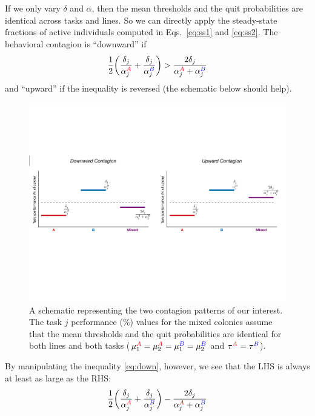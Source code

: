 \documentclass[11pt]{article}
\newcommand{\A}{{\color{red}A}}
\newcommand{\B}{{\color{blue}B}}
\begin{document}
\begin{appendices}
If we only vary $\delta$ and $\alpha$, then the mean thresholds and the quit probabilities are identical across tasks and lines. So we can directly apply the steady-state fractions of active individuals computed in Eqs.~\eqref{eq:ss1} and \eqref{eq:ss2}. The behavioral contagion is ``downward'' if
\begin{equation}
    \frac{1}{2} \bigg( \frac{\delta_j}{\alpha_j^{\A}} + \frac{\delta_j}{\alpha_j^{\B}} \bigg) > \frac{2\delta_j}{\alpha_j^{\A} + \alpha_j^{\B}} \label{eq:down}
\end{equation}
and ``upward'' if the inequality is reversed (the schematic below should help).
\begin{figure}[H]
    \centering
    \includegraphics[width=0.9\linewidth]{doc/schematic_contagion.pdf}
    \caption{A schematic representing the two contagion patterns of our interest. The task $j$ performance (\%) values for the mixed colonies assume that the mean thresholds and the quit probabilities are identical for both lines and both tasks ($\mu_1^{\A} = \mu_2^{\A} = \mu_1^{\B} = \mu_2^{\B}$ and $\tau^{\A} = \tau^{\B}$).}
    \label{fig:schematic}
\end{figure}
\noindent By manipulating the inequality \eqref{eq:down}, however, we see that the LHS is always at least as large as the RHS:
\begin{align}
    \frac{1}{2} \bigg( \frac{\delta_j}{\alpha_j^{\A}} + \frac{\delta_j}{\alpha_j^{\B}} \bigg) - \frac{2\delta_j}{\alpha_j^{\A} + \alpha_j^{\B}} 

\end{align}
\end{appendices}
\end{document}
